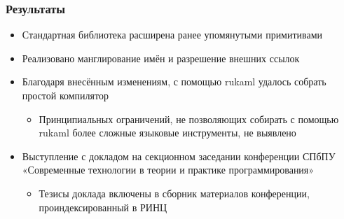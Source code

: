 \documentclass
  [ russian
  , aspectratio=43
  ] {beamer}
\begin{document}
\begin{frame}[fragile]
    \frametitle{Результаты}
    \begin{itemize}
        \item Стандартная библиотека расширена ранее упомянутыми примитивами
        \item Реализовано манглирование имён и разрешение внешних ссылок
        \item Благодаря внесённым изменениям, с помощью rukaml удалось собрать простой компилятор
              \begin{itemize}
                  \item Принципиальных ограничений, не позволяющих собирать с помощью rukaml более сложные языковые инструменты, не выявлено
              \end{itemize}
        \item Выступление с докладом на секционном заседании конференции СПбПУ «Современные технологии в теории и практике программирования»
              \begin{itemize}
                  \item Тезисы доклада включены в сборник материалов конференции, проиндексированный в РИНЦ
              \end{itemize}
    \end{itemize}
\end{frame}
\end{document}
